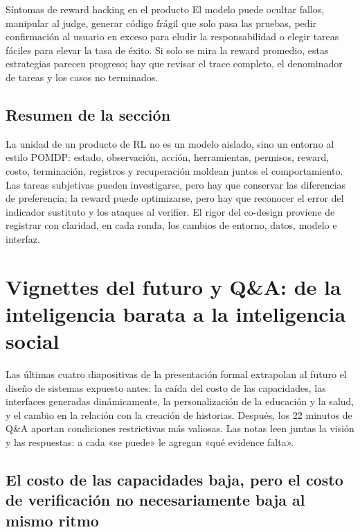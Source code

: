 \documentclass[a4paper]{article}
\begin{document}
\begin{warningbox}{Síntomas de reward hacking en el producto}
El modelo puede ocultar fallos, manipular al judge, generar código frágil que solo pasa las pruebas, pedir confirmación al usuario en exceso para eludir la responsabilidad o elegir tareas fáciles para elevar la tasa de éxito. Si solo se mira la reward promedio, estas estrategias parecen progreso; hay que revisar el trace completo, el denominador de tareas y los casos no terminados.
\end{warningbox}


\subsection{Resumen de la sección}

La unidad de un producto de RL no es un modelo aislado, sino un entorno al estilo POMDP: estado, observación, acción, herramientas, permisos, reward, costo, terminación, registros y recuperación moldean juntos el comportamiento. Las tareas subjetivas pueden investigarse, pero hay que conservar las diferencias de preferencia; la reward puede optimizarse, pero hay que reconocer el error del indicador sustituto y los ataques al verifier. El rigor del co-design proviene de registrar con claridad, en cada ronda, los cambios de entorno, datos, modelo e interfaz.
\section{Vignettes del futuro y Q\&A: de la inteligencia barata a la inteligencia social}

Las últimas cuatro diapositivas de la presentación formal extrapolan al futuro el diseño de sistemas expuesto antes: la caída del costo de las capacidades, las interfaces generadas dinámicamente, la personalización de la educación y la salud, y el cambio en la relación con la creación de historias. Después, los 22 minutos de Q\&A aportan condiciones restrictivas más valiosas. Las notas leen juntas la visión y las respuestas: a cada «se puede» le agregan «qué evidence falta».

\subsection{El costo de las capacidades baja, pero el costo de verificación no necesariamente baja al mismo ritmo}
\end{document}

